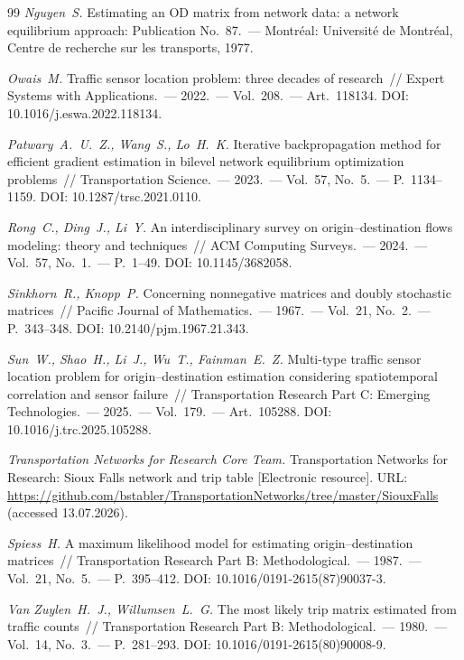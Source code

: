 \documentclass{crm-article}
\begin{document}
\begin{thebibliography}{99}
{\it Nguyen~S.}
Estimating an OD matrix from network data: a network equilibrium approach:
Publication No.~87.~--- Montr\'eal: Universit\'e de Montr\'eal, Centre de
recherche sur les transports, 1977.

{\it Owais~M.}
Traffic sensor location problem: three decades of research~// Expert
Systems with Applications.~--- 2022.~--- Vol.~208.~--- Art.~118134.
DOI: 10.1016/j.eswa.2022.118134.

{\it Patwary~A.~U.~Z., Wang~S., Lo~H.~K.}
Iterative backpropagation method for efficient gradient estimation in
bilevel network equilibrium optimization problems~// Transportation
Science.~--- 2023.~--- Vol.~57, No.~5.~--- P.~1134--1159.
DOI: 10.1287/trsc.2021.0110.

{\it Rong~C., Ding~J., Li~Y.}
An interdisciplinary survey on origin--destination flows modeling: theory
and techniques~// ACM Computing Surveys.~--- 2024.~--- Vol.~57, No.~1.~---
P.~1--49. DOI: 10.1145/3682058.

{\it Sinkhorn~R., Knopp~P.}
Concerning nonnegative matrices and doubly stochastic matrices~// Pacific
Journal of Mathematics.~--- 1967.~--- Vol.~21, No.~2.~--- P.~343--348.
DOI: 10.2140/pjm.1967.21.343.

{\it Sun~W., Shao~H., Li~J., Wu~T., Fainman~E.~Z.}
Multi-type traffic sensor location problem for origin--destination
estimation considering spatiotemporal correlation and sensor failure~//
Transportation Research Part C: Emerging Technologies.~--- 2025.~---
Vol.~179.~--- Art.~105288. DOI: 10.1016/j.trc.2025.105288.

{\it Transportation Networks for Research Core Team.}
Transportation Networks for Research: Sioux Falls network and trip table
[Electronic resource].
URL: \url{https://github.com/bstabler/TransportationNetworks/tree/master/SiouxFalls}
(accessed 13.07.2026).

{\it Spiess~H.}
A maximum likelihood model for estimating origin--destination matrices~//
Transportation Research Part B: Methodological.~--- 1987.~--- Vol.~21,
No.~5.~--- P.~395--412. DOI: 10.1016/0191-2615(87)90037-3.

{\it Van Zuylen~H.~J., Willumsen~L.~G.}
The most likely trip matrix estimated from traffic counts~// Transportation
Research Part B: Methodological.~--- 1980.~--- Vol.~14, No.~3.~---
P.~281--293. DOI: 10.1016/0191-2615(80)90008-9.


\end{thebibliography}
\end{document}
